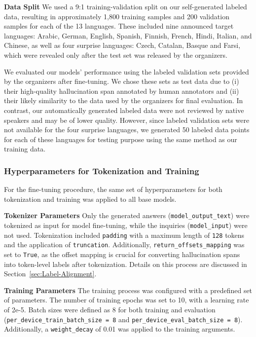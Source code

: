 \documentclass[11pt]{article}
\begin{document}
\textbf{Data Split}  
We used a 9:1 training-validation split on our self-generated labeled data, resulting in approximately 1,800 training samples and 200 validation samples for each of the 13 languages. These included nine announced target languages: Arabic, German, English, Spanish, Finnish, French, Hindi, Italian, and Chinese, as well as four surprise languages: Czech, Catalan, Basque and Farsi, which were revealed only after the test set was released by the organizers.

We evaluated our models' performance using the labeled validation sets provided by the organizers after fine-tuning. We chose these sets as test data due to (i) their high-quality hallucination span annotated by human annotators and (ii) their likely similarity to the data used by the organizers for final evaluation. In contrast, our automatically generated labeled data were not reviewed by native speakers and may be of lower quality. However, since labeled validation sets were not available for the four surprise languages, we generated 50 labeled data points for each of these languages for testing purpose using the same method as our training data.


\subsubsection{Hyperparameters for Tokenization and Training}
For the fine-tuning procedure, the same set of hyperparameters for both tokenization and training was applied to all base models.  

\textbf{Tokenizer Parameters}  
Only the generated answers (\texttt{model\_output\_text}) were tokenized as input for model fine-tuning, while the inquiries (\texttt{model\_input}) were not used. Tokenization included \texttt{padding} with a maximum length of \texttt{128} tokens and the application of \texttt{truncation}. Additionally, \texttt{return\_offsets\_mapping} was set to \texttt{True}, as the offset mapping is crucial for converting hallucination spans into token-level labels after tokenization. Details on this process are discussed in Section~\ref{sec:Label-Alignment}.


\textbf{Training Parameters}
The training process was configured with a predefined set of parameters. The number of training epochs was set to 10, with a learning rate of 2e-5. Batch sizes were defined as 8 for both training and evaluation (\texttt{per\_device\_train\_batch\_size = 8} and \texttt{per\_device\_eval\_batch\_size = 8}). Additionally, a \texttt{weight\_decay} of 0.01 was applied to the training arguments.
\end{document}
